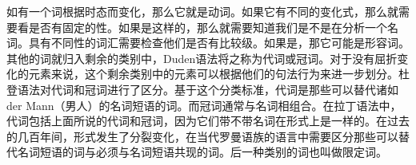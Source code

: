 如有一个词根据时态而变化，那么它就是动词。如果它有不同的变化式，那么就需要看是否有固定的性。如果是这样的，那么就需要知道我们是不是在分析一个名词。具有不同性的词汇需要检查他们是否有比较级。如果是，那它可能是形容词。其他的词就归入剩余的类别中，Duden语法将之称为代词或冠词。对于没有屈折变化的元素来说，这个剩余类别中的元素可以根据他们的句法行为来进一步划分。杜登语法对代词和冠词进行了区分。基于这个分类标准，代词是那些可以替代诸如der Mann（男人）的名词短语的词。而冠词通常与名词相组合。在拉丁语法中，代词包括上面所说的代词和冠词，因为它们带不带名词在形式上是一样的。在过去的几百年间，形式发生了分裂变化，在当代罗曼语族的语言中需要区分那些可以替代名词短语的词与必须与名词短语共现的词。后一种类别的词也叫做限定词。

